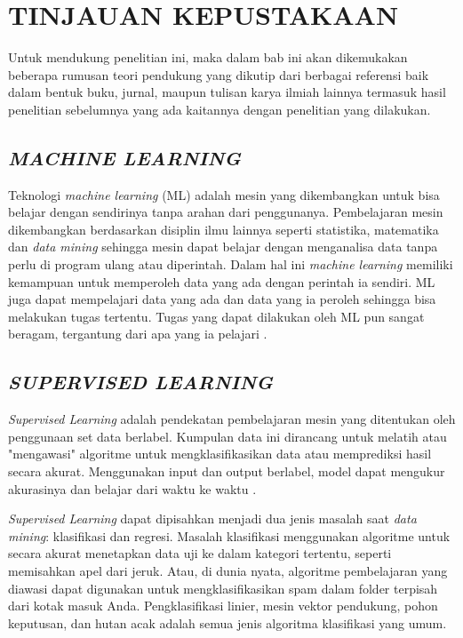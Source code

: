 \fancyhf{}
\fancyfoot[C]{\thepage}
\chapter{TINJAUAN KEPUSTAKAAN}

\par Untuk mendukung penelitian ini, maka dalam bab ini akan dikemukakan beberapa rumusan teori pendukung yang dikutip dari berbagai referensi baik dalam bentuk buku, jurnal, maupun tulisan karya ilmiah lainnya termasuk hasil penelitian sebelumnya yang ada kaitannya dengan penelitian yang dilakukan.

\section{\textit{MACHINE LEARNING}}
Teknologi \textit{machine learning} (ML) adalah mesin yang dikembangkan untuk bisa belajar dengan sendirinya tanpa arahan dari penggunanya. Pembelajaran mesin dikembangkan berdasarkan disiplin ilmu lainnya seperti statistika, matematika dan \textit{data mining} sehingga mesin dapat belajar dengan menganalisa data tanpa perlu di program ulang atau diperintah. Dalam hal ini \textit{machine learning} memiliki kemampuan untuk memperoleh data yang ada dengan perintah ia sendiri. ML juga dapat mempelajari data yang ada dan data yang ia peroleh sehingga bisa melakukan tugas tertentu. Tugas yang dapat dilakukan oleh ML pun sangat beragam, tergantung dari apa yang ia pelajari \citep{Baker2019}.

\section{\uppercase{\textit{SUPERVISED LEARNING}}}
\textit{Supervised Learning} adalah pendekatan pembelajaran mesin yang ditentukan oleh penggunaan set data berlabel. Kumpulan data ini dirancang untuk melatih atau "mengawasi" algoritme untuk mengklasifikasikan data atau memprediksi hasil secara akurat. Menggunakan input dan output berlabel, model dapat mengukur akurasinya dan belajar dari waktu ke waktu \citep{Gramejo2020}.

\par \textit{Supervised Learning} dapat dipisahkan menjadi dua jenis masalah saat \textit{data mining}: klasifikasi dan regresi. Masalah klasifikasi menggunakan algoritme untuk secara akurat menetapkan data uji ke dalam kategori tertentu, seperti memisahkan apel dari jeruk. Atau, di dunia nyata, algoritme pembelajaran yang diawasi dapat digunakan untuk mengklasifikasikan spam dalam folder terpisah dari kotak masuk Anda. Pengklasifikasi linier, mesin vektor pendukung, pohon keputusan, dan hutan acak adalah semua jenis algoritma klasifikasi yang umum.

